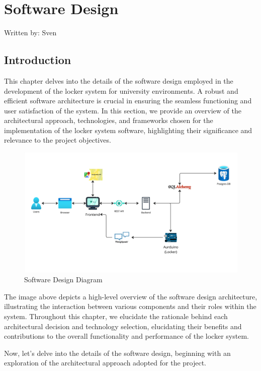 \section{Software Design}
{\tiny Written by: Sven}

\subsection{Introduction}
This chapter delves into the details of the software design employed in the development of the locker system for university environments. A robust and efficient software architecture is crucial in ensuring the seamless functioning and user satisfaction of the system. In this section, we provide an overview of the architectural approach, technologies, and frameworks chosen for the implementation of the locker system software, highlighting their significance and relevance to the project objectives.

\begin{figure}[h]
    \centering
    \includegraphics[width=\textwidth]{images/software_design_diagram}
    \caption{Software Design Diagram}
    \label{fig:software_design}
\end{figure}

The image above depicts a high-level overview of the software design architecture, illustrating the interaction between various components and their roles within the system. Throughout this chapter, we elucidate the rationale behind each architectural decision and technology selection, elucidating their benefits and contributions to the overall functionality and performance of the locker system.

Now, let's delve into the details of the software design, beginning with an exploration of the architectural approach adopted for the project.

